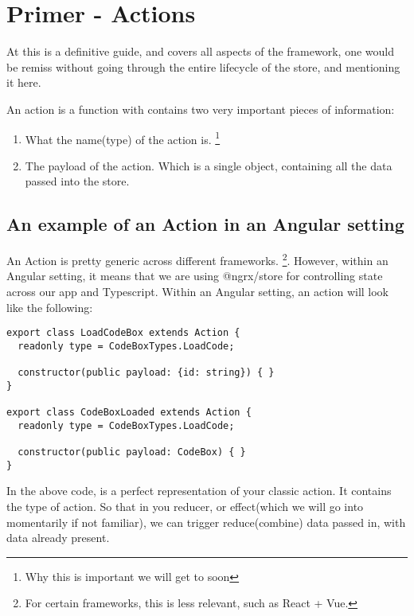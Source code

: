 \maketitle{}
\section{ Primer - Actions }
At this is a definitive guide, and covers all aspects of the framework, one
would be remiss without going through the entire lifecycle of the store, and
mentioning it here.

An action is a function with contains two very important pieces of information:
\begin{enumerate}
  \item What the name(type) of the action is. \footnote{Why this is important we
  will get to soon}
  \item The payload of the action. Which is a single object, containing all the
  data passed into the store.
\end{enumerate}

\subsection{An example of an Action in an Angular setting}
An Action is pretty generic across different frameworks. \footnote{For certain
frameworks, this is less relevant, such as React + Vue.}. However, within an
Angular setting, it means that we are using @ngrx/store for controlling state
across our app and Typescript. Within an Angular setting, an action will look
like the following:
\begin{lstlisting}
export class LoadCodeBox extends Action {
  readonly type = CodeBoxTypes.LoadCode;

  constructor(public payload: {id: string}) { }
}

export class CodeBoxLoaded extends Action {
  readonly type = CodeBoxTypes.LoadCode;

  constructor(public payload: CodeBox) { }
}
\end{lstlisting}

In the above code, is a perfect representation of your classic action. It
contains the type of action. So that in you reducer, or effect(which we will
go into momentarily if not familiar), we can trigger reduce(combine) data passed
in, with data already present.


